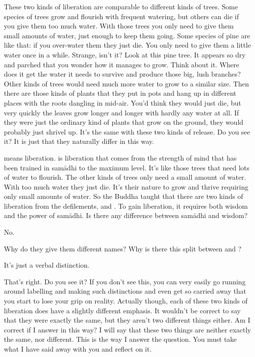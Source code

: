 These two kinds of liberation are comparable to different kinds of trees. Some species of trees grow and flourish with frequent watering, but others can die if you give them too much water. With those trees you only need to give them small amounts of water, just enough to keep them going. Some species of pine are like that: if you over-water them they just die. You only need to give them a little water once in a while. Strange, isn't it? Look at this pine tree. It appears so dry and parched that you wonder how it manages to grow. Think about it. Where does it get the water it needs to survive and produce those big, lush branches? Other kinds of trees would need much more water to grow to a similar size. Then there are those kinds of plants that they put in pots and hang up in different places with the roots dangling in mid-air. You'd think they would just die, but very quickly the leaves grow longer and longer with hardly any water at all. If they were just the ordinary kind of plants that grow on the ground, they would probably just shrivel up. It's the same with these two kinds of release. Do you see it? It is just that they naturally differ in this way.

 means liberation.  is liberation that comes from the strength of mind that has been trained in sam\=adhi to the maximum level. It's like those trees that need lots of water to flourish. The other kinds of trees only need a small amount of water. With too much water they just die. It's their nature to grow and thrive requiring only small amounts of water. So the Buddha taught that there are two kinds of liberation from the defilements,  and . To gain liberation, it requires both wisdom and the power of sam\=adhi. Is there any difference between sam\=adhi and wisdom?

 No.

 Why do they give them different names? Why is there this split between  and ?

 It's just a verbal distinction.

 That's right. Do you see it? If you don't see this, you can very easily go running around labelling and making such distinctions and even get so carried away that you start to lose your grip on reality. Actually though, each of these two kinds of liberation does have a slightly different emphasis. It wouldn't be correct to say that they were exactly the same, but they aren't two different things either. Am I correct if I answer in this way? I will say that these two things are neither exactly the same, nor different. This is the way I answer the question. You must take what I have said away with you and reflect on it.

